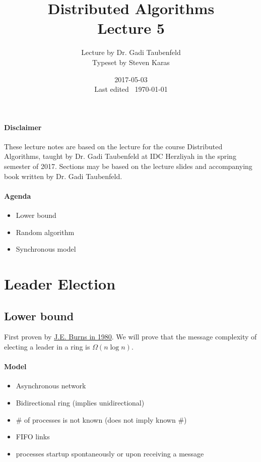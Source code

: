 \documentclass{idc_msc}
\title{Distributed Algorithms\\\large Lecture 5}
\date{2017-05-03 \\ Last edited \currenttime\ \today}
\author{Lecture by Dr. Gadi Taubenfeld\\Typeset by Steven Karas}
\begin{document}
\maketitle

\paragraph{Disclaimer}

These lecture notes are based on the lecture for the course Distributed Algorithms, taught by Dr. Gadi Taubenfeld at IDC Herzliyah in the spring semester of 2017.
Sections may be based on the lecture slides and accompanying book written by Dr. Gadi Taubenfeld.

\paragraph{Agenda}

\begin{itemize}
  \item Lower bound
  \item Random algorithm
  \item Synchronous model
\end{itemize}

\section{Leader Election}

\subsection{Lower bound}
First proven by \href{https://www.cs.indiana.edu/ftp/techreports/TR91.pdf}{J.E. Burns in 1980}.
We will prove that the message complexity of electing a leader in a ring is $\Omega(n \log n)$.

\paragraph{Model}

\begin{itemize}
  \item Asynchronous network
  \item Bidirectional ring (implies unidirectional)
  \item \# of processes is not known (does not imply known \#)
  \item FIFO links
  \item processes startup spontaneously or upon receiving a message
\end{itemize}
\end{document}
